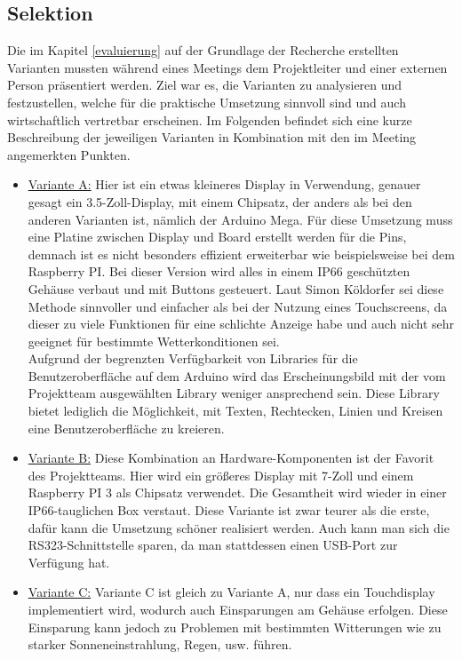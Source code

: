 \newpage
\subsection{Selektion} \label{selektion}
Die im Kapitel \ref{evaluierung} auf der Grundlage der Recherche erstellten Varianten mussten während eines Meetings dem Projektleiter und einer externen Person präsentiert werden. Ziel war es, die Varianten zu analysieren und festzustellen, welche für die praktische Umsetzung sinnvoll sind und auch wirtschaftlich vertretbar erscheinen. Im Folgenden befindet sich eine kurze Beschreibung der jeweiligen Varianten in Kombination mit den im Meeting angemerkten Punkten.

\begin{itemize}
	\item \underline{Variante A:} Hier ist ein etwas kleineres Display in Verwendung, genauer gesagt ein 3.5-Zoll-Display, mit einem Chipsatz, der anders als bei den anderen Varianten ist, nämlich der Arduino Mega. Für diese Umsetzung muss eine Platine zwischen Display und Board erstellt werden für die Pins, demnach ist es nicht besonders effizient erweiterbar wie beispielsweise bei dem Raspberry PI. Bei dieser Version wird alles in einem IP66 geschützten Gehäuse verbaut und mit Buttons gesteuert. Laut Simon Köldorfer sei diese Methode sinnvoller und einfacher als bei der Nutzung eines Touchscreens, da dieser zu viele Funktionen für eine schlichte Anzeige habe und auch nicht sehr geeignet für bestimmte Wetterkonditionen sei. \\
	Aufgrund der begrenzten Verfügbarkeit von Libraries für die Benutzeroberfläche auf dem Arduino wird das Erscheinungsbild mit der vom Projektteam ausgewählten Library weniger ansprechend sein. Diese Library bietet lediglich die Möglichkeit, mit Texten, Rechtecken, Linien und Kreisen eine Benutzeroberfläche zu kreieren.
	\item \underline{Variante B:} Diese Kombination an Hardware-Komponenten ist der Favorit des Projektteams. Hier wird ein größeres Display mit 7-Zoll und einem Raspberry PI 3 als Chipsatz verwendet. Die Gesamtheit wird wieder in einer IP66-tauglichen Box verstaut. Diese Variante ist zwar teurer als die erste, dafür kann die Umsetzung schöner realisiert werden. Auch kann man sich die RS323-Schnittstelle sparen, da man stattdessen einen USB-Port zur Verfügung hat.
	\item \underline{Variante C:} Variante C ist gleich zu Variante A, nur dass ein Touchdisplay implementiert wird, wodurch auch Einsparungen am Gehäuse erfolgen. Diese Einsparung kann jedoch zu Problemen mit bestimmten Witterungen wie zu starker Sonneneinstrahlung, Regen, usw. führen. 

\end{itemize}
